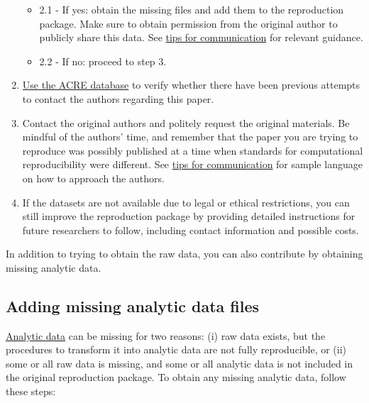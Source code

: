 \documentclass[]{book}
\providecommand{\tightlist}{%
  \setlength{\itemsep}{0pt}\setlength{\parskip}{0pt}}
\begin{document}
\begin{enumerate}
  \begin{itemize}
  \tightlist
  \item
    2.1 - If yes: obtain the missing files and add them to the reproduction package. Make sure to obtain permission from the original author to publicly share this data. See \protect\hyperlink{tips-for-communication}{tips for communication} for relevant guidance.\\
  \item
    2.2 - If no: proceed to step 3.\\
  \end{itemize}
\item
  \href{ADD\%20LINK}{Use the ACRE database} to verify whether there have been previous attempts to contact the authors regarding this paper.\\
\item
  Contact the original authors and politely request the original materials. Be mindful of the authors' time, and remember that the paper you are trying to reproduce was possibly published at a time when standards for computational reproducibility were different. See \protect\hyperlink{tips-for-communication}{tips for communication} for sample language on how to approach the authors.\\
\item
  If the datasets are not available due to legal or ethical restrictions, you can still improve the reproduction package by providing detailed instructions for future researchers to follow, including contact information and possible costs.
\end{enumerate}

In addition to trying to obtain the raw data, you can also contribute by obtaining missing analytic data.

\hypertarget{ad}{%
\subsection{Adding missing analytic data files}\label{ad}}

\protect\hyperlink{describe-inputs}{Analytic data} can be missing for two reasons: (i) raw data exists, but the procedures to transform it into analytic data are not fully reproducible, or (ii) some or all raw data is missing, and some or all analytic data is not included in the original reproduction package. To obtain any missing analytic data, follow these steps:
\end{document}
